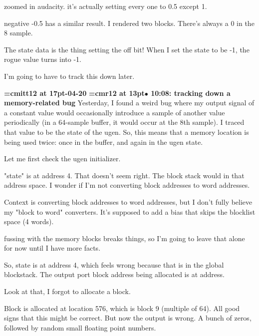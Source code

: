 zoomed in audacity. it's actually setting every one to 0.5 except 1.
\par

negative -0.5 has a similar result. I rendered two blocks. There's always a 0 in the 8 sample.
\par

The state data is the thing setting the off bit! When I set the state to be -1, the rogue value turns into -1.
\par

I'm going to have to track this down later.
\par

{\medskip\noindent\bf\font\titlefont=cmitt12 at 17pt-04-20}\medskip
{\smallskip\noindent\bf\font\titlefont=cmr12 at 13pt\titlefont $\bullet$ 10:08: tracking down a memory-related bug}\smallskip
Yesterday, I found a weird bug where my output signal of a constant value would occasionally introduce a sample of another value periodically (in a 64-sample buffer, it would occur at the 8th sample). I traced that value to be the state of the ugen. So, this means that a memory location is being used twice: once in the buffer, and again in the ugen state.
\par

Let me first check the ugen initializer.
\par

"state" is at address 4. That doesn't seem right. The block stack would in that address space. I wonder if I'm not converting block addresses to word addresses.
\par

Context is converting block addresses to word addresses, but I don't fully believe my "block to word" converters. It's supposed to add a bias that skips the blocklist space (4 words).
\par

fussing with the memory blocks breaks things, so I'm going to leave that alone for now until I have more facts.
\par

So, state is at address 4, which feels wrong because that is in the global blockstack. The output port block address being allocated is at address.
\par

Look at that, I forgot to allocate a block.
\par

Block is allocated at location 576, which is block 9 (multiple of 64). All good signs that this might be correct. But now the output is wrong. A bunch of zeros, followed by random small floating point numbers.
\par

